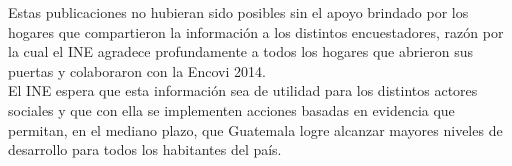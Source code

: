 Estas publicaciones no hubieran sido posibles sin el apoyo brindado por los hogares que compartieron la información a los distintos encuestadores, razón por la cual el INE agradece profundamente a todos los hogares que abrieron sus puertas y colaboraron con la Encovi 2014.\\

El INE espera que esta información sea de utilidad para los distintos actores sociales y que con ella se implementen acciones basadas en evidencia que permitan, en el mediano plazo, que Guatemala logre alcanzar mayores niveles de desarrollo para todos los habitantes del país.

\cleardoublepage
